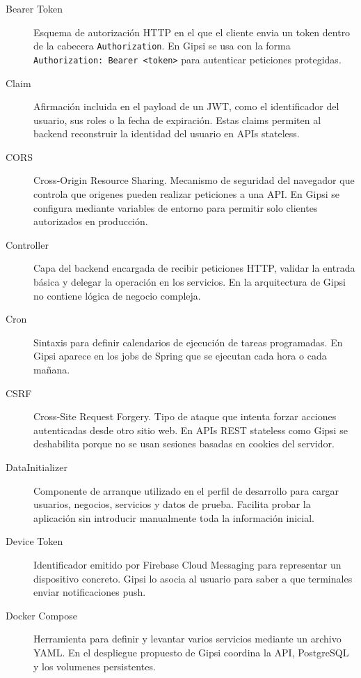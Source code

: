\documentclass[12pt,a4paper,twoside]{report}
\begin{document}
\begin{description}
  \item[Bearer Token]
  Esquema de autorizaci\'on HTTP en el que el cliente envia un token dentro de la cabecera
  \texttt{Authorization}. En Gipsi se usa con la forma
  \texttt{Authorization: Bearer <token>} para autenticar peticiones protegidas.

  \item[Claim]
  Afirmaci\'on incluida en el payload de un JWT, como el identificador del usuario, sus
  roles o la fecha de expiraci\'on. Estas claims permiten al backend reconstruir la
  identidad del usuario en APIs stateless.

  \item[CORS]
  Cross-Origin Resource Sharing. Mecanismo de seguridad del navegador que controla que
  origenes pueden realizar peticiones a una API. En Gipsi se configura mediante variables
  de entorno para permitir solo clientes autorizados en producci\'on.

  \item[Controller]
  Capa del backend encargada de recibir peticiones HTTP, validar la entrada b\'asica y
  delegar la operaci\'on en los servicios. En la arquitectura de Gipsi no contiene l\'ogica
  de negocio compleja.

  \item[Cron]
  Sintaxis para definir calendarios de ejecuci\'on de tareas programadas. En Gipsi aparece
  en los jobs de Spring que se ejecutan cada hora o cada ma\~nana.

  \item[CSRF]
  Cross-Site Request Forgery. Tipo de ataque que intenta forzar acciones autenticadas
  desde otro sitio web. En APIs REST stateless como Gipsi se deshabilita porque no se
  usan sesiones basadas en cookies del servidor.

  \item[DataInitializer]
  Componente de arranque utilizado en el perfil de desarrollo para cargar usuarios,
  negocios, servicios y datos de prueba. Facilita probar la aplicaci\'on sin introducir
  manualmente toda la informaci\'on inicial.

  \item[Device Token]
  Identificador emitido por Firebase Cloud Messaging para representar un dispositivo
  concreto. Gipsi lo asocia al usuario para saber a que terminales enviar notificaciones
  push.

  \item[Docker Compose]
  Herramienta para definir y levantar varios servicios mediante un archivo YAML. En el
  despliegue propuesto de Gipsi coordina la API, PostgreSQL y los volumenes persistentes.


\end{description}
\end{document}

